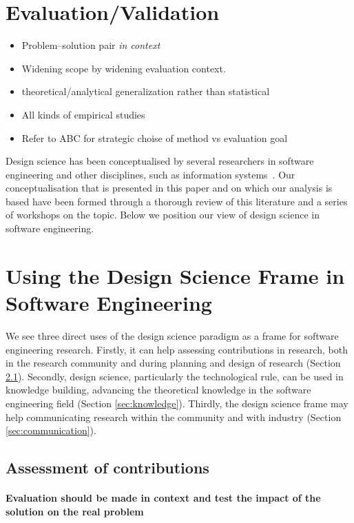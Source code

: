 \documentclass[graybox]{svmult}
\begin{document}
\section{Evaluation/Validation}
\begin{itemize}
\item Problem--solution pair \emph{in context}
\item Widening scope by widening evaluation context. 
\item theoretical/analytical generalization rather than statistical 
\item All kinds of empirical studies \cite{easterbrook_selecting_2008}\cite{Runeson12Case,WohlinExpBook12}
\item Refer to ABC \cite{StolABC18} for strategic choise of method vs evaluation goal
\end{itemize}



Design science has been conceptualised by several researchers in software engineering and other disciplines, such as information systems~\cite{gregor_positioning_2013}. Our conceptualisation that is presented in this paper and on which our analysis is based have been formed through a thorough review of this literature and a series of workshops on the topic. Below we position our view of design science in software engineering.



\section{Using the Design Science Frame in Software Engineering}
We see three direct uses of the design science paradigm as a frame for software engineering research. Firstly, it can help assessing contributions in research, both in the research community and during planning and design of research (Section \ref{sec:assessment}). Secondly, design science, particularly the technological rule, can be used in knowledge building, advancing the theoretical knowledge in the software engineering field (Section \ref{sec:knowledge}). Thirdly, the design science frame may help communicating research within the community and with industry (Section \ref{sec:communication}).

\subsection{Assessment of contributions}
\label{sec:assessment}
\paragraph{Evaluation should be made in context and test the impact of the solution on the real problem}
\end{document}
